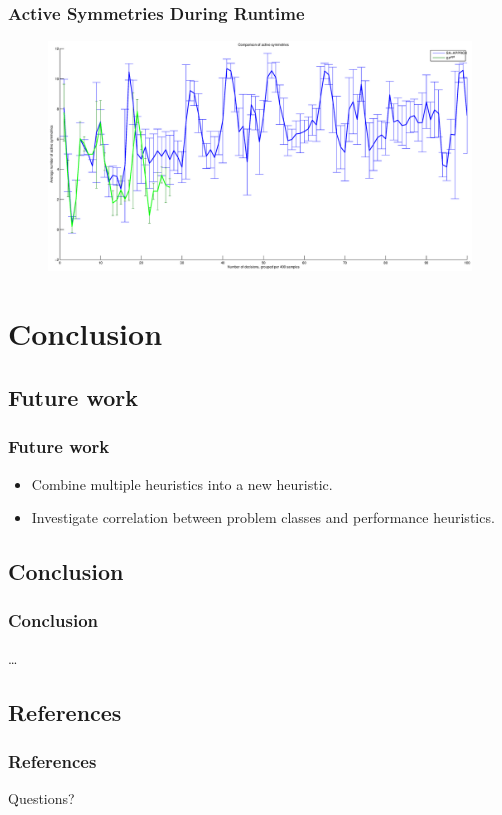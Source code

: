 \documentclass{beamer}
\begin{document}
	\begin{frame}[plain]
		\frametitle{Active Symmetries During Runtime}
		\begin{figure}
			\centerline{\includegraphics[width=1.4\textwidth]{../results/battleship-12-23-approx-vs-reg.eps}}
			\label{fig:active_symmetries_during_search}
		\end{figure}
	\end{frame}
	
	
\section{Conclusion}

	\subsection{Future work}
	\begin{frame}
		\frametitle{Future work}
		
		\begin{itemize}
			\item Combine multiple heuristics into a new heuristic.
			\item Investigate correlation between problem classes and performance heuristics.
		\end{itemize}
	\end{frame}

	\subsection{Conclusion}
	\begin{frame}
		\frametitle{Conclusion}
		\ldots
	\end{frame}

	\subsection{References}
	\begin{frame}[allowframebreaks]
		\frametitle{References}
		
		
	\end{frame}

	\begin{frame}
	\Huge{\centerline{Questions?}}
	\end{frame}
\end{document}
